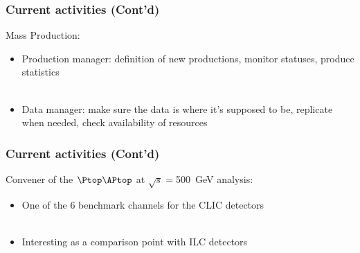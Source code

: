 \documentclass{beamer}
\begin{document}
{

\begin{frame} 
\frametitle{Current activities (Cont'd)}
Mass Production:\\
\begin{itemize}
  \item \alert{Production manager}: definition of new productions, monitor
  statuses, produce statistics~\\ ~\\
  \item {\color{blue}Data manager}: make sure the data is where it's supposed to
  be, replicate when needed, check availability of resources
\end{itemize}
\end{frame}
}
{

\begin{frame}
\frametitle{Current activities (Cont'd)}
Convener of the $\Ptop\APtop$ at $\sqrt{s}=$500~GeV analysis:\\
\begin{itemize}
  \item One of the 6 benchmark channels for the CLIC detectors~\\ ~\\
  \item Interesting as a comparison point with ILC detectors
\end{itemize}
\end{frame}
 }
\end{document}
